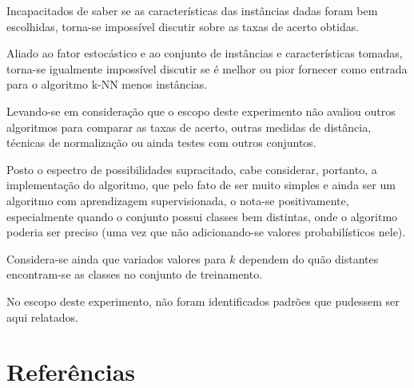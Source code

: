 \documentclass[12pt]{article}
\begin{document}
		Incapacitados de saber se as características das instâncias dadas foram bem escolhidas, torna-se impossível discutir sobre as taxas de acerto obtidas.
		
		Aliado ao fator estocástico e ao conjunto de instâncias e características tomadas, torna-se igualmente impossível discutir se é melhor ou pior fornecer como entrada para o algoritmo k-NN menos instâncias.

		Levando-se em consideração que o escopo deste experimento não avaliou outros algoritmos para comparar as taxas de acerto, outras medidas de distância, técnicas de normalização ou ainda testes com outros conjuntos.

		Posto o espectro de possibilidades supracitado, cabe considerar, portanto, a implementação do algoritmo, que pelo fato de ser muito simples e ainda ser um algoritmo com aprendizagem supervisionada, o nota-se positivamente, especialmente quando o conjunto possui classes bem distintas, onde o algoritmo poderia ser preciso (uma vez que não adicionando-se valores probabilísticos nele).

		Considera-se ainda que variados valores para $k$ dependem do quão distantes encontram-se as classes no conjunto de treinamento.

		No escopo deste experimento, não foram identificados padrões que pudessem ser aqui relatados.

	\section{Referências}\label{sec:referencias}

		
\end{document}
